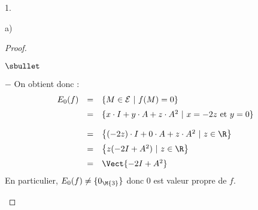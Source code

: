 \begin{noliste}{1.}
\begin{noliste}{a)}
\begin{proof}
\begin{noliste}{$\sbullet$}
\begin{noliste}{$-$}
    On obtient donc :
    \[
     \begin{array}{rcl}
      E_{0}(f) & = & \left\{ M\in\mathcal{E} \ | \ f(M)= 
      0 \right\}
      \\[.2cm]
      & = & \{ x \cdot I+y \cdot A+z \cdot A^2 \ | \
       x = -2z \mbox{ et }
       y = 0
      \}
      \\[.4cm]
      & = & \left\{ (-2z)\cdot I + 0 \cdot A + z \cdot A^2 
      \ | \ z\in\R\right\}
      \\[.2cm]
      & = & \left\{ z(-2I + A^2) 
      \ | \ z\in\R\right\}
      \\[.2cm]
      & = & \Vect{-2I+A^2}
     \end{array}
    \]
    En particulier, $E_{0}(f)\neq \{0_{\M{3}}\}$ donc $0$ est 
    valeur propre de $f$.
    

\end{noliste}
\end{noliste}
\end{proof}
\end{noliste}
\end{noliste}
